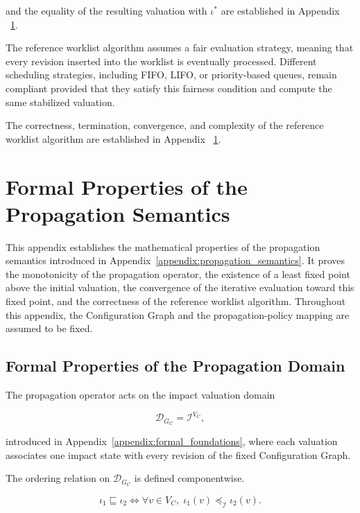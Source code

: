\documentclass[10pt]{article}
\begin{document}
and the equality of the resulting valuation with $\iota^{*}$ are established in Appendix ~\ref{appendix:formal_properties}.

The reference worklist algorithm assumes a fair evaluation strategy, meaning that every revision inserted into the worklist is eventually processed.
Different scheduling strategies, including FIFO, LIFO, or priority-based queues, remain compliant provided that they satisfy this fairness condition and compute the same stabilized valuation.

The correctness, termination, convergence, and complexity of the reference worklist algorithm are established in Appendix ~\ref{appendix:formal_properties}.

\section{Formal Properties of the Propagation Semantics}
\label{appendix:formal_properties}

This appendix establishes the mathematical properties of the propagation
semantics introduced in Appendix~\ref{appendix:propagation_semantics}. It proves
the monotonicity of the propagation operator, the existence of a least fixed
point above the initial valuation, the convergence of the iterative evaluation
toward this fixed point, and the correctness of the reference worklist
algorithm. Throughout this appendix, the Configuration Graph and the
propagation-policy mapping are assumed to be fixed.

\subsection{Formal Properties of the Propagation Domain}
\label{appendix:finite_lattice}
The propagation operator acts on the impact valuation domain

\[
\mathcal D_{G_C}
=
\mathcal I^{V_C},
\]

introduced in Appendix~\ref{appendix:formal_foundations}, where each valuation associates one impact state with every revision of the fixed Configuration
Graph.

The ordering relation on $\mathcal D_{G_C}$ is defined componentwise.

\begin{equation}
	\label{eq:product_order}
	\iota_1
	\sqsubseteq
	\iota_2
	\iff
	\forall v\in V_C,\;
	\iota_1(v)
	\preceq_{\mathcal I}
	\iota_2(v).
\end{equation}
\end{document}
